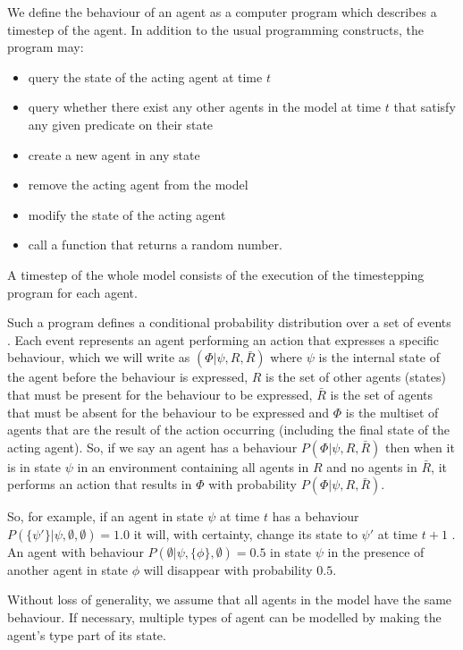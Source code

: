 \documentclass{article}
\begin{document}
We define the behaviour of an agent as a computer program which describes a timestep of the agent. In addition to the usual programming constructs, the program may:
\begin{itemize}
\item query the state of the acting agent at time $t$
\item query whether there exist any other agents in the model at time $t$ that satisfy any given predicate on their state
\item create a new agent in any state
\item remove the acting agent from the model
\item modify the state of the acting agent
\item call a function that returns a random number.
\end{itemize}
A timestep of the whole model consists of the execution of the timestepping program for each agent.

Such a program defines a conditional probability distribution over a set of events \cite{staton2016semantics}. Each event represents an agent performing an action that expresses a specific behaviour, which we will write as $(\Phi|\psi,R,\bar{R})$ where $\psi$ is the internal state of the agent before the behaviour is expressed, $R$ is the set of other agents (states) that must be present for the behaviour to be expressed, $\bar{R}$ is the set of agents that must be absent for the behaviour to be expressed and $\Phi$ is the multiset of agents that are the result of the action occurring (including the final state of the acting agent). So, if we say an agent has a behaviour $P(\Phi|\psi,R,\bar{R})$ then when it is in state $\psi$ in an environment containing all agents in $R$ and no agents in $\bar{R}$, it performs an action that results in $\Phi$ with probability $P(\Phi|\psi,R,\bar{R})$.

So, for example, if an agent in state $\psi$ at time $t$ has a behaviour $P(\{\psi'\}|\psi,\emptyset,\emptyset) = 1.0$ it will, with certainty, change its state to $\psi'$ at time $t+1$ . An agent with behaviour $P(\emptyset|\psi,\{\phi\},\emptyset) = 0.5$ in state $\psi$ in the presence of another agent in state $\phi$ will disappear with probability $0.5$.

Without loss of generality, we assume that all agents in the model have the same behaviour. If necessary, multiple types of agent can be modelled by making the agent's type part of its state.
\end{document}
